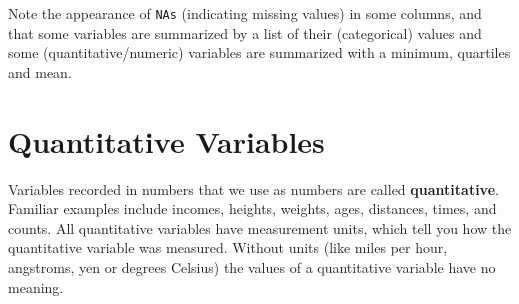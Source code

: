 \documentclass[
]{book}
\begin{document}
Note the appearance of \texttt{NA\textquotesingle{}s} (indicating missing values) in some columns, and that some variables are summarized by a list of their (categorical) values and some (quantitative/numeric) variables are summarized with a minimum, quartiles and mean.

\hypertarget{quantitative-variables}{%
\section{Quantitative Variables}\label{quantitative-variables}}

Variables recorded in numbers that we use as numbers are called \textbf{quantitative}. Familiar examples include incomes, heights, weights, ages, distances, times, and counts. All quantitative variables have measurement units, which tell you how the quantitative variable was measured. Without units (like miles per hour, angstroms, yen or degrees Celsius) the values of a quantitative variable have no meaning.
\end{document}
